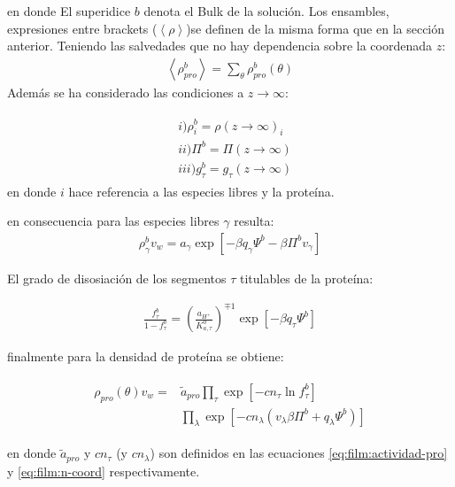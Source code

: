 \noindent en donde El superidice $b$ denota el Bulk de la soluci\'on. 
 Los ensambles, expresiones entre brackets ($\left<\rho\right>$)se definen de la misma forma que en la secci\'on anterior. Teniendo las salvedades que no hay dependencia sobre la coordenada $z$:
 \begin{align}
 	\left<\rho^b_{pro}\right> = \sum_{\theta}\rho^b_{pro}(\theta)
 \end{align}
 Adem\'as se ha considerado las condiciones a $z \to \infty$:

\begin{align}
	\begin{aligned}
		& i)\rho^b_i =\rho(z \rightarrow \infty)_i   \\
		& ii)  \Pi^b = \Pi(z \rightarrow \infty) \\
		& iii) g_\tau^b = g_\tau(z \rightarrow \infty)  
	\end{aligned}
\end{align}
\noindent en donde $i$ hace referencia a las especies libres y la prote\'ina. 

en consecuencia para las especies libres $\gamma$ resulta:
\begin{align}
	\rho^b_\gamma v_w = a_\gamma \exp\left[ -\beta q_\gamma \Psi^b -\beta \Pi^b v_\gamma \right]
	\label{eq:film:rhofree-bulk}
\end{align}

El grado de disosiaci\'on de los segmentos $\tau$ titulables de la prote\'ina:

\begin{align}
		\frac{f^b_\tau}{1-f^b_\tau} = \left(\frac{a_{H^+}}{K^0_{a,\tau}}\right)^{\mp 1} \exp[-\beta q_\tau \Psi^b]
\end{align}


finalmente para la densidad de prote\'ina se obtiene:

\begin{align}
	\begin{aligned}
		\rho_{pro}(\theta)v_w = &\tilde{a}_{pro} \prod_\tau \exp\left[-cn_\tau \ln f^b_\tau\right] \\
		& \prod_\lambda \exp \left[-cn_\lambda (v_\lambda\beta\Pi^b + q_\lambda \Psi^b) \right]
	\end{aligned}
	\label{eq:film:rhopro-bulk}
\end{align}

\noindent en donde $\tilde{a}_{pro}$ y $cn_\tau$ (y $cn_\lambda$) son definidos en las ecuaciones  \ref{eq:film:actividad-pro} y \ref{eq:film:n-coord} respectivamente. 


